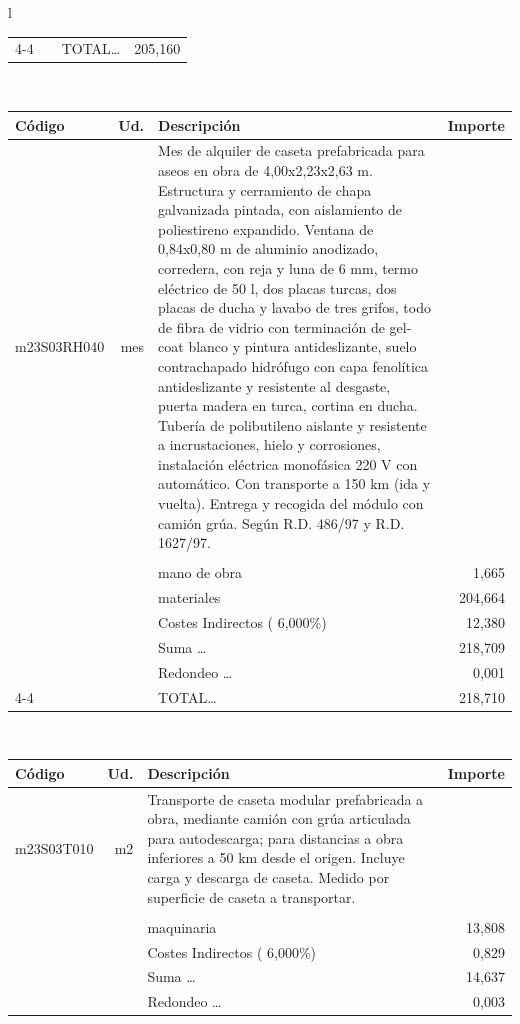 \documentclass{book}%
\begin{document}
\begin{longtable}{l}
\begin{tabular}{l r p{60mm} r}
\cline{4-4}%
&&TOTAL\ldots&   205,160\\%
\end{tabular}\\%
\begin{tabular}{l r p{60mm} r}%
Código&Ud.&Descripción&Importe\\%
\hline%
m23S03RH040&mes&Mes de alquiler de caseta prefabricada para aseos en obra de 4,00x2,23x2,63 m. Estructura y cerramiento de chapa galvanizada pintada, con aislamiento de poliestireno expandido. Ventana de 0,84x0,80 m de aluminio anodizado, corredera, con reja y luna de 6 mm, termo eléctrico de 50 l, dos placas turcas, dos placas de ducha y lavabo de tres grifos, todo de fibra de vidrio con terminación de gel{-}coat blanco y pintura antideslizante, suelo contrachapado hidrófugo con capa fenolítica antideslizante y resistente al desgaste, puerta madera en turca, cortina en ducha. Tubería de polibutileno aislante y resistente a incrustaciones, hielo y corrosiones, instalación eléctrica monofásica 220 V con automático. Con transporte a 150 km (ida y vuelta). Entrega y recogida del módulo con camión grúa. Según R.D. 486/97 y R.D. 1627/97.&\\%
&&&\\%
&&mano de obra&     1,665\\%
&&materiales&   204,664\\%
&&Costes Indirectos (     6,000\%)&    12,380\\%
&&Suma \ldots&   218,709\\%
&&Redondeo \ldots&     0,001\\%
\cline{4-4}%
&&TOTAL\ldots&   218,710\\%
\end{tabular}\\%
\begin{tabular}{l r p{60mm} r}%
Código&Ud.&Descripción&Importe\\%
\hline%
m23S03T010&m2&Transporte de caseta modular prefabricada a obra, mediante camión con grúa articulada para autodescarga; para distancias a obra inferiores a 50 km desde el origen. Incluye carga y descarga de caseta. Medido por superficie de caseta a transportar.&\\%
&&&\\%
&&maquinaria&    13,808\\%
&&Costes Indirectos (     6,000\%)&     0,829\\%
&&Suma \ldots&    14,637\\%
&&Redondeo \ldots&     0,003\\%

\end{tabular}
\end{longtable}
\end{document}
